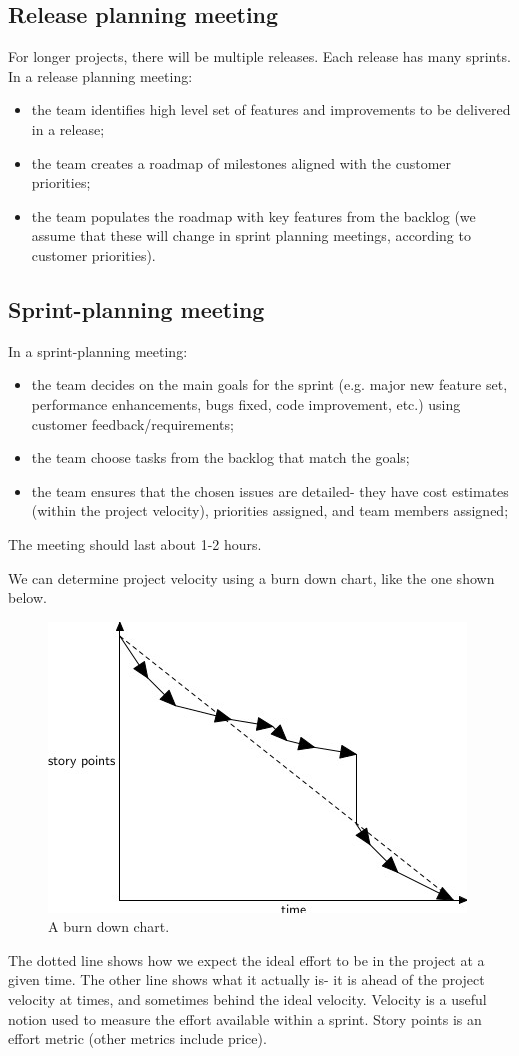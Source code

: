 \documentclass[a4paper, openany]{memoir}
\begin{document}
\subsection{Release planning meeting}
For longer projects, there will be multiple releases. Each release has many sprints. In a release planning meeting:
\begin{itemize}
    \item the team identifies high level set of features and improvements to be delivered in a release;
    \item the team creates a roadmap of milestones aligned with the customer priorities;
    \item the team populates the roadmap with key features from the backlog (we assume that these will change in sprint planning meetings, according to customer priorities).
\end{itemize}

\subsection{Sprint-planning meeting}
In a sprint-planning meeting:
\begin{itemize}
    \item the team decides on the main goals for the sprint (e.g. major new feature set, performance enhancements, bugs fixed, code improvement, etc.)  using customer feedback/requirements;
    \item the team choose tasks from the backlog that match the goals;
    \item the team ensures that the chosen issues are detailed- they have cost estimates (within the project velocity), priorities assigned, and team members assigned;
\end{itemize}
The meeting should last about 1-2 hours.

We can determine project velocity using a burn down chart, like the one shown below.
\begin{figure}[H]
    \centering
    \includegraphics[scale=0.8]{src/2.2 BurnDownCharts.png}
    \caption{A burn down chart.}
\end{figure}
\noindent The dotted line shows how we expect the ideal effort to be in the project at a given time. The other line shows what it actually is- it is ahead of the project velocity at times, and sometimes behind the ideal velocity. Velocity is a useful notion used to measure the effort available within a sprint. Story points is an effort metric (other metrics include price).
\end{document}
